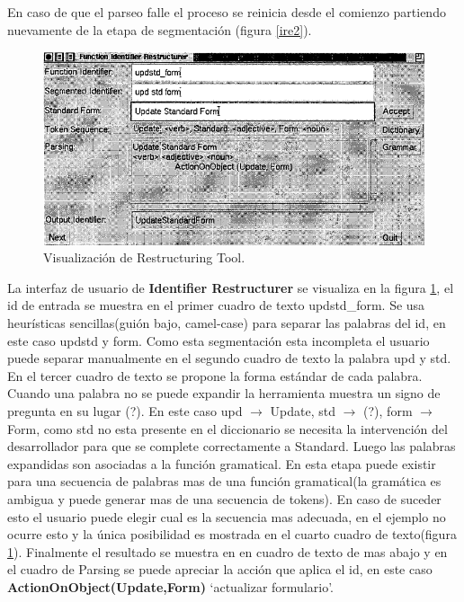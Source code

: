 \documentclass[12pt]{report}
\begin{document}
\begin{description}
En caso de que el parseo falle el proceso se reinicia desde el comienzo partiendo nuevamente de la etapa de segmentación\cite{BCPT00} (figura \ref{ire2}).
\end{description}

\begin{figure}[t] %
\centering
\includegraphics[scale= 0.80]{./ire_4.png}
\caption{Visualización de Restructuring Tool.}
\label{ire4}
\end{figure}

La interfaz de usuario de \textbf{Identifier Restructurer} se visualiza en la figura \ref{ire4}, el id de entrada se muestra en el primer cuadro de texto \textsf{updstd\_form}. Se usa heurísticas sencillas(guión bajo, camel-case) para separar las palabras del id, en este caso \textsf{updstd} y \textsf{form}. Como esta segmentación esta incompleta el usuario puede separar manualmente en el segundo cuadro de texto la palabra \textsf{upd} y \textsf{std}. En el tercer cuadro de texto se propone la forma estándar de cada palabra. Cuando una palabra no se puede expandir la herramienta muestra un signo de pregunta en su lugar (?). En este caso \textsf{upd} $\rightarrow$ \textsf{Update}, \textsf{std} $\rightarrow$ (?), \textsf{form} $\rightarrow$ \textsf{Form}, como \textsf{std} no esta presente en el diccionario se necesita la intervención del desarrollador para que se complete correctamente a \textsf{Standard}. Luego las palabras expandidas son asociadas a la función gramatical. En esta etapa puede existir para una secuencia de palabras mas de una función gramatical(la gramática es ambigua y puede generar mas de una secuencia de tokens). En caso de suceder esto el usuario puede elegir cual es la secuencia mas adecuada, en el ejemplo no ocurre esto y la única posibilidad es mostrada en el cuarto cuadro de texto(figura \ref{ire4}). Finalmente el resultado se muestra en en cuadro de texto de mas abajo y en el cuadro de Parsing se puede apreciar la acción que aplica el id, en este caso \textbf{ActionOnObject(Update,Form)} `actualizar formulario'.
\end{document}
